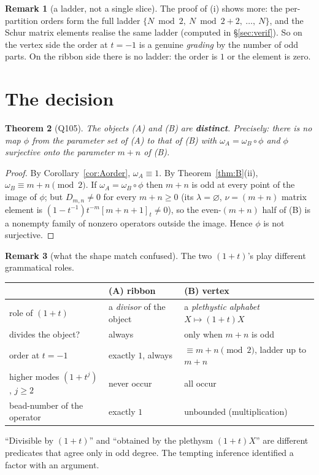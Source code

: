 \documentclass[11pt]{article}
\newtheorem{theorem}{Theorem}[section]
\theoremstyle{definition}
\newtheorem{remark}[theorem]{Remark}
\begin{document}
\begin{remark}[a ladder, not a single slice]\label{rem:ladder}
The proof of (i) shows more: the per-partition orders form the full ladder
$\{N\bmod2,\ N\bmod 2+2,\ \dots,\ N\}$, and the Schur matrix elements realise the same
ladder (computed in \S\ref{sec:verif}).  So on the vertex side the order at $t=-1$ is a
genuine \emph{grading} by the number of odd parts.  On the ribbon side there is no ladder:
the order is $1$ or the element is zero.
\end{remark}

\section{The decision}

\begin{theorem}[Q105]\label{thm:decision}
The objects (A) and (B) are \textbf{distinct}.  Precisely: there is no map $\phi$ from the
parameter set of (A) to that of (B) with $\omega_A=\omega_B\circ\phi$ and $\phi$ surjective
onto the parameter $m+n$ of (B).
\end{theorem}

\begin{proof}
By Corollary~\ref{cor:Aorder}, $\omega_A\equiv1$.  By Theorem~\ref{thm:B}(ii),
$\omega_B\equiv m+n\pmod 2$.  If $\omega_A=\omega_B\circ\phi$ then $m+n$ is odd at every
point of the image of $\phi$; but $D_{m,n}\neq0$ for every $m+n\ge0$ (its $\lambda=\varnothing$,
$\nu=(m+n)$ matrix element is $(1-t^{-1})t^{-m}[m+n+1]_t\neq0$), so the even-$(m+n)$ half of
(B) is a nonempty family of nonzero operators outside the image.  Hence $\phi$ is not
surjective.
\end{proof}

\begin{remark}[what the shape match confused]\label{rem:divisor-vs-alphabet}
The two $(1+t)$'s play different grammatical roles.
\begin{center}
\begin{tabular}{lll}
 & \textbf{(A) ribbon} & \textbf{(B) vertex}\\\hline
role of $(1+t)$ & a \emph{divisor} of the object & a \emph{plethystic alphabet} $X\mapsto(1+t)X$\\
divides the object? & always & only when $m+n$ is odd\\
order at $t=-1$ & exactly $1$, always & $\equiv m+n \pmod 2$, ladder up to $m+n$\\
higher modes $(1+t^{j})$, $j\ge2$ & never occur & all occur\\
bead-number of the operator & exactly $1$ & unbounded (multiplication)
\end{tabular}
\end{center}
``Divisible by $(1+t)$'' and ``obtained by the plethysm $(1+t)X$'' are different predicates
that agree only in odd degree.  The tempting inference identified a factor with an argument.
\end{remark}
\end{document}
